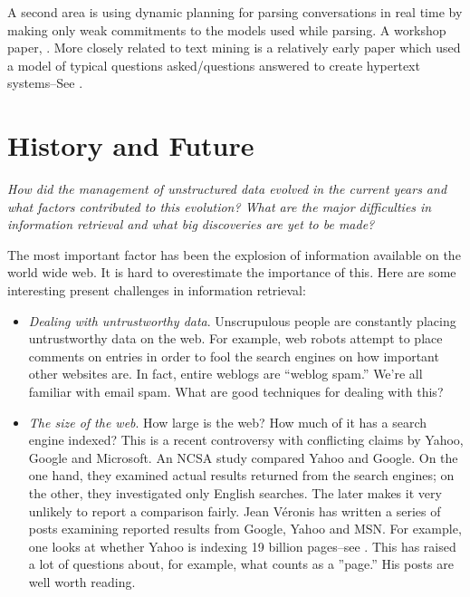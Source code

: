 \documentclass[11pt]{article}
\begin{document}
{A second area is using dynamic planning for parsing conversations in real time by making only weak commitments to the models used while parsing. A workshop paper, . More closely related to text mining is a relatively early paper which used a model of typical questions asked/questions answered to create hypertext systems--See . 

\section{History and Future} 
\textit{How did the management of unstructured data evolved in the current years and what factors contributed to this evolution? What are the major difficulties in information retrieval and what big discoveries are yet to be made?}

The most important factor has been the explosion of information available on the world wide web. It is hard to overestimate the importance of this. Here are some interesting present challenges in information retrieval:

\begin{itemize}
\item \textit{Dealing with untrustworthy data}. Unscrupulous people are constantly placing untrustworthy data on the web. For example, web robots attempt to place comments on  entries in order to fool the search engines on how important other websites are. In fact, entire weblogs are ``weblog spam.'' We're all familiar with email spam. What are good techniques for dealing with this?

\item \textit{The size of the web}. How large is the web? How much of it has a search engine indexed? This is a recent controversy with conflicting claims by Yahoo, Google and Microsoft. An NCSA study  compared Yahoo and Google. On the one hand, they examined actual results returned from the search engines; on the other, they investigated only English searches. The later makes it very unlikely to report a comparison fairly. Jean Véronis has written a series of posts examining reported results from Google, Yahoo and MSN. For example, one looks at whether Yahoo is indexing 19 billion pages--see . This has raised a lot of questions about, for example, what counts as a ''page.'' His posts are well worth reading.
	

\end{itemize}}
\end{document}
